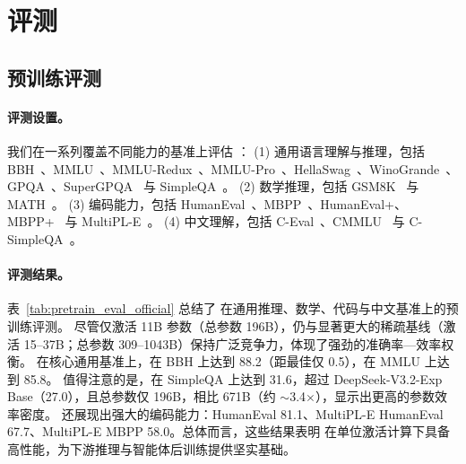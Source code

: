 \section{评测}


\subsection{预训练评测}\label{sec:evals}

\begingroup
\renewcommand{\arraystretch}{1.1}



\endgroup


\paragraph{评测设置。} 我们在一系列覆盖不同能力的基准上评估 \ourmodel：
(1) 通用语言理解与推理，包括 BBH~\cite{suzgun2022challengingbbh}、MMLU~\cite{hendrycks2020mmlu}、MMLU-Redux~\cite{gema2024donewithmmlu}、MMLU-Pro~\cite{wang2024mmlupro}、HellaSwag~\cite{zellers2019hellaswag}、WinoGrande~\cite{sakaguchi2019winogrande}、GPQA~\cite{rein2023gpqa}、SuperGPQA~\cite{du2025supergpqa} 与 SimpleQA~\cite{openai2024simpleqa}。
(2) 数学推理，包括 GSM8K~\cite{cobbe2021gsm8k} 与 MATH~\cite{hendrycks2021math}。
(3) 编码能力，包括 HumanEval~\cite{chen2021evaluatinglargelanguagemodels}、MBPP~\cite{austin2021programsynthesislargelanguage}、HumanEval+、MBPP+~\cite{liu2023evalplus} 与 MultiPL-E~\cite{cassano2022multipl}。
(4) 中文理解，包括 C-Eval~\cite{huang2023ceval}、CMMLU~\cite{li2023cmmlu} 与 C-SimpleQA~\cite{he2024chinesesimpleqa}。

\paragraph{评测结果。}
表~\ref{tab:pretrain_eval_official} 总结了 \ourmodel 在通用推理、数学、代码与中文基准上的预训练评测。
尽管仅激活 11B 参数（总参数 196B），\ourmodel 仍与显著更大的稀疏基线（激活 15--37B；总参数 309--1043B）保持广泛竞争力，体现了强劲的准确率—效率权衡。
在核心通用基准上，\ourmodel 在 BBH 上达到 88.2（距最佳仅 0.5），在 MMLU 上达到 85.8。
值得注意的是，\ourmodel 在 SimpleQA 上达到 31.6，超过 DeepSeek-V3.2-Exp Base（27.0），且总参数仅 196B，相比 671B（约 $\sim$3.4$\times$），显示出更高的参数效率密度。
\ourmodel 还展现出强大的编码能力：HumanEval 81.1、MultiPL-E HumanEval 67.7、MultiPL-E MBPP 58.0。总体而言，这些结果表明 \ourmodel 在单位激活计算下具备高性能，为下游推理与智能体后训练提供坚实基础。

